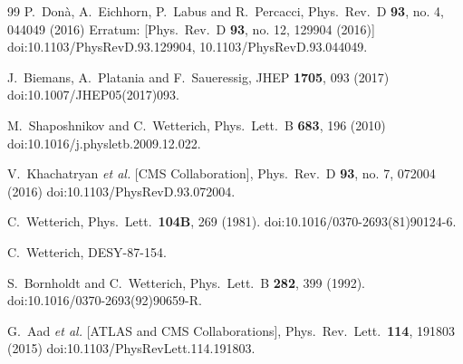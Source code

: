 \documentclass[%
 reprint,
 superscriptaddress,
preprintnumbers,
nofootinbib,
 amsmath,amssymb,
 aps,
prl,
]{revtex4-1}
\begin{document}
\begin{thebibliography}{99}
  P.~Don\`a, A.~Eichhorn, P.~Labus and R.~Percacci,
  Phys.\ Rev.\ D {\bf 93}, no. 4, 044049 (2016)
  Erratum: [Phys.\ Rev.\ D {\bf 93}, no. 12, 129904 (2016)]
  doi:10.1103/PhysRevD.93.129904, 10.1103/PhysRevD.93.044049.
  
  J.~Biemans, A.~Platania and F.~Saueressig,
  JHEP {\bf 1705}, 093 (2017)
  doi:10.1007/JHEP05(2017)093.
  
  M.~Shaposhnikov and C.~Wetterich,
  Phys.\ Lett.\ B {\bf 683}, 196 (2010)
  doi:10.1016/j.physletb.2009.12.022.
    
  V.~Khachatryan {\it et al.} [CMS Collaboration],
  Phys.\ Rev.\ D {\bf 93}, no. 7, 072004 (2016)
  doi:10.1103/PhysRevD.93.072004.
 
  
  C.~Wetterich,
  Phys.\ Lett.\  {\bf 104B}, 269 (1981).
  doi:10.1016/0370-2693(81)90124-6.
  
  C.~Wetterich,
  DESY-87-154.
  
  S.~Bornholdt and C.~Wetterich,
  Phys.\ Lett.\ B {\bf 282}, 399 (1992).
  doi:10.1016/0370-2693(92)90659-R.
 
  
  G.~Aad {\it et al.} [ATLAS and CMS Collaborations],
  Phys.\ Rev.\ Lett.\  {\bf 114}, 191803 (2015)
  doi:10.1103/PhysRevLett.114.191803.
  

\end{thebibliography}
\end{document}
